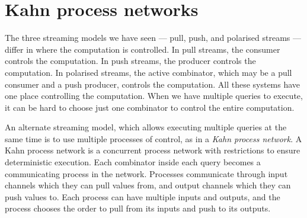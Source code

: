 % 
% 
% 
% 
% 

\section{Kahn process networks}
\label{taxonomy/kpn}

The three streaming models we have seen --- pull, push, and polarised streams --- differ in where the computation is controlled.
In pull streams, the consumer controls the computation.
In push streams, the producer controls the computation.
In polarised streams, the active combinator, which may be a pull consumer and a push producer, controls the computation.
All these systems have one place controlling the computation.
When we have multiple queries to execute, it can be hard to choose just one combinator to control the entire computation.

An alternate streaming model, which allows executing multiple queries at the same time is to use multiple processes of control, as in a \emph{Kahn process network}.
A Kahn process network is a concurrent process network with restrictions to ensure deterministic execution.
Each combinator inside each query becomes a communicating process in the network.
Processes communicate through input channels which they can pull values from, and output channels which they can push values to.
Each process can have multiple inputs and outputs, and the process chooses the order to pull from its inputs and push to its outputs.

